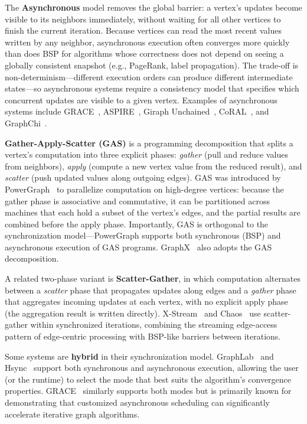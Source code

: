 The \textbf{Asynchronous} model removes the global barrier: a vertex's updates become visible to its neighbors immediately, without waiting for all other vertices to finish the current iteration.
Because vertices can read the most recent values written by any neighbor, asynchronous execution often converges more quickly than does BSP for algorithms whose correctness does not depend on seeing a globally consistent snapshot (e.g., PageRank, label propagation).
The trade-off is non-determinism---different execution orders can produce different intermediate states---so asynchronous systems require a consistency model that specifies which concurrent updates are visible to a given vertex.
Examples of asynchronous systems include GRACE~\cite{wang2013asynchronous}, ASPIRE~\cite{vora2014aspire}, Giraph Unchained~\cite{han2015giraph}, CoRAL~\cite{vora2017coral}, and GraphChi~\cite{kyrola2012graphchi}.

\textbf{Gather-Apply-Scatter (GAS)} is a programming decomposition that splits a vertex's computation into three explicit phases: \emph{gather} (pull and reduce values from neighbors), \emph{apply} (compute a new vertex value from the reduced result), and \emph{scatter} (push updated values along outgoing edges).
GAS was introduced by PowerGraph~\cite{gonzalez2012powergraph} to parallelize computation on high-degree vertices: because the gather phase is associative and commutative, it can be partitioned across machines that each hold a subset of the vertex's edges, and the partial results are combined before the apply phase.
Importantly, GAS is orthogonal to the synchronization model---PowerGraph supports both synchronous (BSP) and asynchronous execution of GAS programs.
GraphX~\cite{gonzalez2014graphx} also adopts the GAS decomposition.

A related two-phase variant is \textbf{Scatter-Gather}, in which computation alternates between a \emph{scatter} phase that propagates updates along edges and a \emph{gather} phase that aggregates incoming updates at each vertex, with no explicit apply phase (the aggregation result is written directly).
X-Stream~\cite{roy2013x} and Chaos~\cite{royChaos2015} use scatter-gather within synchronized iterations, combining the streaming edge-access pattern of edge-centric processing with BSP-like barriers between iterations.

Some systems are \textbf{hybrid} in their synchronization model.
GraphLab~\cite{low2014graphlab} and Hsync~\cite{Xie2015Hsync} support both synchronous and asynchronous execution, allowing the user (or the runtime) to select the mode that best suits the algorithm's convergence properties.
GRACE~\cite{wang2013asynchronous} similarly supports both modes but is primarily known for demonstrating that customized asynchronous scheduling can significantly accelerate iterative graph algorithms.

